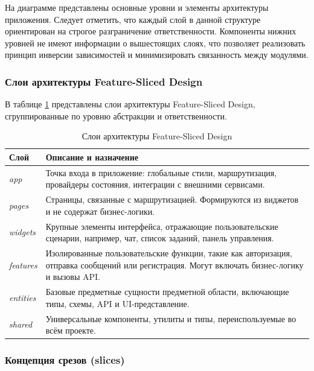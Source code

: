 На диаграмме представлены основные уровни и элементы архитектуры приложения. Следует отметить, что каждый слой в данной структуре ориентирован на строгое разграничение ответственности. Компоненты нижних уровней не имеют информации о вышестоящих слоях, что позволяет реализовать принцип инверсии зависимостей и минимизировать связанность между модулями.

\subsubsection{Слои архитектуры Feature-Sliced Design}

В таблице \ref{tab:fsd-layers} представлены слои архитектуры Feature-Sliced Design, сгруппированные по уровню абстракции и ответственности.

\begin{table}[h]
  \centering
  \caption{Слои архитектуры Feature-Sliced Design}
  \label{tab:fsd-layers}
  \begin{tabular}{|p{3cm}|p{11cm}|}
    \hline
    \textbf{Слой} & \textbf{Описание и назначение} \\ \hline
    \textit{app}      & Точка входа в приложение: глобальные стили, маршрутизация, провайдеры состояния, интеграции с внешними сервисами. \\ \hline
    \textit{pages}    & Страницы, связанные с маршрутизацией. Формируются из виджетов и не содержат бизнес-логики. \\ \hline
    \textit{widgets}  & Крупные элементы интерфейса, отражающие пользовательские сценарии, например, чат, список заданий, панель управления. \\ \hline
    \textit{features}& Изолированные пользовательские функции, такие как авторизация, отправка сообщений или регистрация. Могут включать бизнес-логику и вызовы API. \\ \hline
    \textit{entities} & Базовые предметные сущности предметной области, включающие типы, схемы, API и UI-представление. \\ \hline
    \textit{shared}   & Универсальные компоненты, утилиты и типы, переиспользуемые во всём проекте. \\ \hline
  \end{tabular}
\end{table}

\subsubsection{Концепция срезов (slices)}

